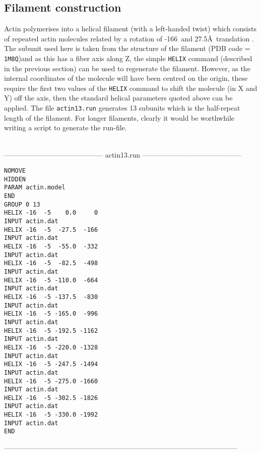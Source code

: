 \subsection{Filament construction}

Actin polymerises into a helical filament (with a left-handed twist) which consists of
repeated actin molecules related by a rotation of -166\degre\ and 27.5\AA\ translation
\cite{HolmesKC09}.  The subunit used here is taken from the structure of the filament
(PDB code = {\tt 1M8Q})and as this has a fiber axis along Z, the simple {\tt HELIX} command
(described in the previous section) can be used to regenerate the filament.  However,
as the internal coordinates of the molecule will have been centred on the origin,
these require the first two values of the {\tt HELIX} command to shift the molecule
(in X and Y) off the axis, then the standard helical parameters quoted above can be
applied.   The file {\tt actin13.run} generates 13 subunits which is the half-repeat
length of the filament.  For longer filaments, clearly it would be worthwhile writing
a script to generate the run-file.

\begin{singlespace}
\ \\
------------------------------------------
actin13.run
------------------------------------------
\begin{verbatim}
NOMOVE
HIDDEN
PARAM actin.model
END
GROUP 0 13
HELIX -16  -5    0.0     0
INPUT actin.dat
HELIX -16  -5  -27.5  -166
INPUT actin.dat
HELIX -16  -5  -55.0  -332
INPUT actin.dat
HELIX -16  -5  -82.5  -498
INPUT actin.dat
HELIX -16  -5 -110.0  -664
INPUT actin.dat
HELIX -16  -5 -137.5  -830
INPUT actin.dat
HELIX -16  -5 -165.0  -996
INPUT actin.dat
HELIX -16  -5 -192.5 -1162
INPUT actin.dat
HELIX -16  -5 -220.0 -1328
INPUT actin.dat
HELIX -16  -5 -247.5 -1494
INPUT actin.dat
HELIX -16  -5 -275.0 -1660
INPUT actin.dat
HELIX -16  -5 -302.5 -1826
INPUT actin.dat
HELIX -16  -5 -330.0 -1992
INPUT actin.dat
END
\end{verbatim}
---------------------------------------------------------------------------------------------------
\end{singlespace}
